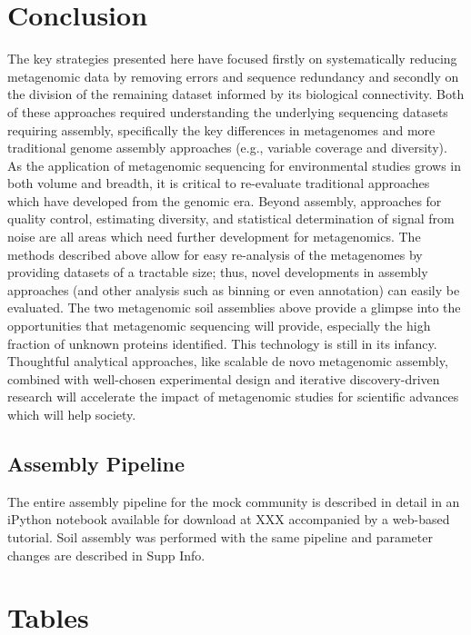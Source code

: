 \documentclass[11pt]{article} %
\begin{document}
\section{Conclusion}
The key strategies presented here have focused firstly on systematically reducing metagenomic data by removing errors and sequence redundancy and secondly on the division of the remaining dataset informed by its biological connectivity.  Both of these approaches required understanding the underlying sequencing datasets requiring assembly, specifically the key differences in metagenomes and more traditional genome assembly approaches (e.g., variable coverage and diversity).   As the application of metagenomic sequencing for environmental studies grows in both volume and breadth, it is critical to re-evaluate traditional approaches which have developed from the genomic era.  Beyond assembly, approaches for quality control, estimating diversity, and statistical determination of signal from noise are all areas which need further development for metagenomics.  The methods described above allow for easy re-analysis of the metagenomes by providing datasets of a tractable size; thus, novel developments in assembly approaches (and other analysis such as binning or even annotation) can easily be evaluated.  The two metagenomic soil assemblies above provide a glimpse into the opportunities that metagenomic sequencing will provide, especially the high fraction of unknown proteins identified.  This technology is still in its infancy.  Thoughtful analytical approaches, like scalable de novo metagenomic assembly, combined with well-chosen experimental design and iterative discovery-driven research will accelerate the impact of metagenomic studies for scientific advances which will help society.

\subsection{Assembly Pipeline}
The entire assembly pipeline for the mock community is described in detail in an iPython notebook available for download at XXX accompanied by a web-based tutorial.  Soil assembly was performed with the same pipeline and parameter changes are described in Supp Info.



\section{Tables}
\end{document}
